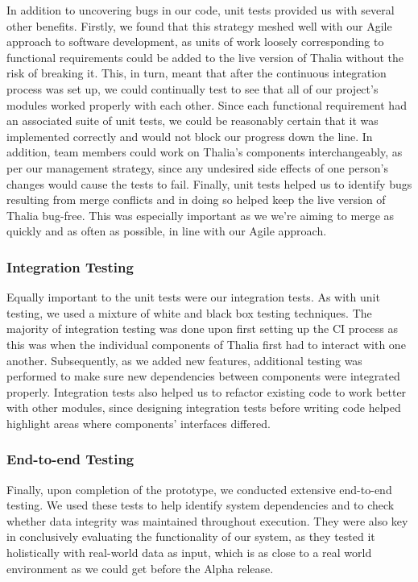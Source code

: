 \documentclass[main.tex]{subfiles}
\begin{document}
In addition to uncovering bugs in our code, unit tests provided us with several other benefits. 
Firstly, we found that this strategy meshed well with our Agile approach to software development, as units of work loosely corresponding to functional requirements could be added to the live version of Thalia without the risk of breaking it. This, in turn, meant that after the continuous integration process was set up, we could continually test to see that all of our project's modules worked properly with each other. Since each functional requirement had an associated suite of unit tests, we could be reasonably certain that it was implemented correctly and would not block our progress down the line. 
In addition, team members could work on Thalia’s components interchangeably, as per our management strategy, since any undesired side effects of one person’s changes would cause the tests to fail. 
Finally, unit tests helped us to identify bugs resulting from merge conflicts and in doing so helped keep the live version of Thalia bug-free. This was especially important as we we're aiming to merge as quickly and as often as possible, in line with our Agile approach.

\subsubsection{Integration Testing}
Equally important to the unit tests were our integration tests. As with unit testing, we used a mixture of white and black box testing techniques. The majority of integration testing was done upon first setting up the CI process as this was when the individual components of Thalia first had to interact with one another. Subsequently, as we added new features, additional testing was performed to make sure new dependencies between components were integrated properly. Integration tests also helped us to refactor existing code to work better with other modules, since designing integration tests before writing code helped highlight areas where components' interfaces differed.

\subsubsection{End-to-end Testing}
Finally, upon completion of the prototype, we conducted extensive end-to-end testing. We used these tests to help identify system dependencies and to check whether data integrity was maintained throughout execution. They were also key in conclusively evaluating the functionality of our system, as they tested it holistically with real-world data as input, which is as close to a real world environment as we could get before the Alpha release.
\end{document}
